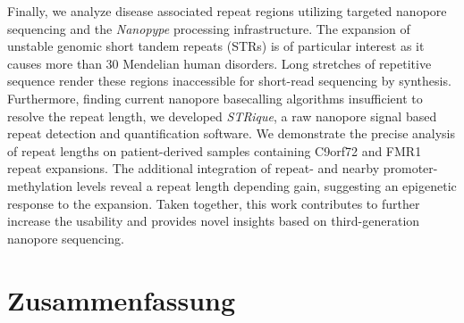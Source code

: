 Finally, we analyze disease associated repeat regions utilizing targeted nanopore sequencing and the \textit{Nanopype} processing infrastructure.
The expansion of unstable genomic short tandem repeats (STRs) is of particular interest as it causes more than 30 Mendelian human disorders.
Long stretches of repetitive sequence render these regions inaccessible for short-read sequencing by synthesis.
Furthermore, finding current nanopore basecalling algorithms insufficient to resolve the repeat length, we developed \textit{STRique}, a raw nanopore signal based repeat detection and quantification software.
We demonstrate the precise analysis of repeat lengths on patient-derived samples containing C9orf72 and FMR1 repeat expansions. 
The additional integration of repeat- and nearby promoter-methylation levels reveal a repeat length depending gain, suggesting an epigenetic response to the expansion.
Taken together, this work contributes to further increase the usability and provides novel insights based on third-generation nanopore sequencing.




\cleardoublepage
\vspace*{2mm}
\section*{Zusammenfassung}
\label{sec:zusammenfassung}


